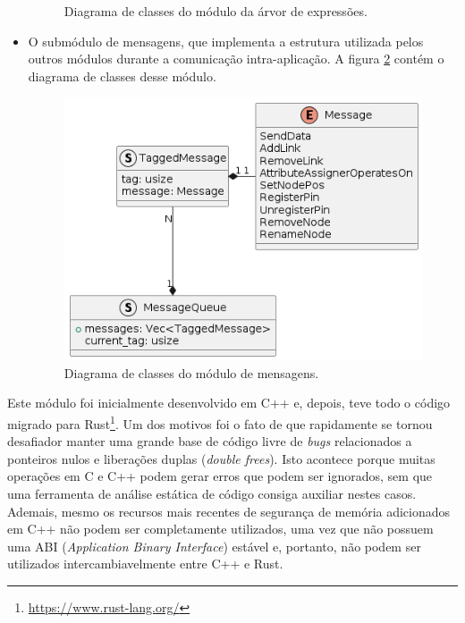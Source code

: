 \documentclass[
	12pt,				%
	openright,			%
	oneside,			%
	a4paper,			%
	main=brazil,
	english,			%
	]{ufsj-abntex2}
\begin{document}
\begin{itemize}
\begin{figure}[h]
        \caption{Diagrama de classes do módulo da árvor de expressões.}
        \label{fig:uml-expr}
    \end{figure}
    \item O submódulo de mensagens, que implementa a estrutura utilizada pelos outros módulos durante a comunicação intra-aplicação. A figura \ref{fig:uml-msg} contém o diagrama de classes desse módulo.
    \begin{figure}[h]
        \centering
        \includegraphics[scale=0.45]{diagrams/img/messages.png} 
        \caption{Diagrama de classes do módulo de mensagens.}
        \label{fig:uml-msg}
    \end{figure}
\end{itemize}

Este módulo foi inicialmente desenvolvido em C++ e, depois, teve todo o código migrado para Rust\footnote{\url{https://www.rust-lang.org/}}. Um dos motivos foi o fato de que rapidamente se tornou desafiador manter uma grande base de código livre de \textit{bugs} relacionados a ponteiros nulos e liberações duplas (\textit{double frees}). Isto acontece porque muitas operações em C e C++ podem gerar erros que podem ser ignorados, sem que uma ferramenta de análise estática de código consiga auxiliar nestes casos. Ademais, mesmo os recursos mais recentes de segurança de memória adicionados em C++ não podem ser completamente utilizados, uma vez que não possuem uma ABI (\textit{Application Binary Interface}) estável e, portanto, não podem ser utilizados intercambiavelmente entre C++ e Rust.
\end{document}
